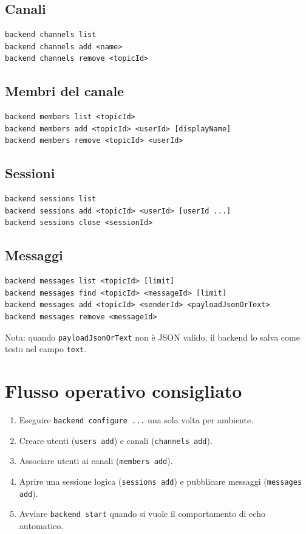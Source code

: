 \documentclass[a4paper, 11pt, twoside]{report}
\begin{document}
\subsection{Canali}
\begin{verbatim}
backend channels list
backend channels add <name>
backend channels remove <topicId>
\end{verbatim}

\subsection{Membri del canale}
\begin{verbatim}
backend members list <topicId>
backend members add <topicId> <userId> [displayName]
backend members remove <topicId> <userId>
\end{verbatim}

\subsection{Sessioni}
\begin{verbatim}
backend sessions list
backend sessions add <topicId> <userId> [userId ...]
backend sessions close <sessionId>
\end{verbatim}

\subsection{Messaggi}
\begin{verbatim}
backend messages list <topicId> [limit]
backend messages find <topicId> <messageId> [limit]
backend messages add <topicId> <senderId> <payloadJsonOrText>
backend messages remove <messageId>
\end{verbatim}

\noindent Nota: quando \texttt{payloadJsonOrText} non è JSON valido, il backend lo salva come testo nel campo \texttt{text}.

\section{Flusso operativo consigliato}

\begin{enumerate}
    \item Eseguire \texttt{backend configure ...} una sola volta per ambiente.
    \item Creare utenti (\texttt{users add}) e canali (\texttt{channels add}).
    \item Associare utenti ai canali (\texttt{members add}).
    \item Aprire una sessione logica (\texttt{sessions add}) e pubblicare messaggi (\texttt{messages add}).
    \item Avviare \texttt{backend start} quando si vuole il comportamento di echo automatico.
\end{enumerate}
\end{document}
